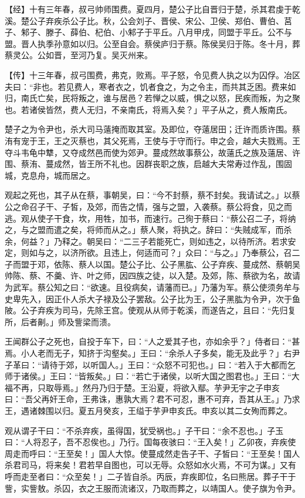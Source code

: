 \documentclass[]{article}
\begin{document}
【经】十有三年春，叔弓帅师围费。夏四月，楚公子比自晋归于楚，杀其君虔于乾溪。楚公子弃疾杀公子比。秋，公会刘子、晋侯、宋公、卫侯、郑伯、曹伯、莒子、邾子、滕子、薛伯、杞伯、小邾子于平丘。八月甲戌，同盟于平丘。公不与盟。晋人执季孙意如以归。公至自会。蔡侯庐归于蔡。陈侯吴归于陈。冬十月，葬蔡灵公。公如晋，至河乃复。吴灭州来。

【传】十三年春，叔弓围费，弗克，败焉。平子怒，令见费人执之以为囚俘。冶区夫曰：``非也。若见费人，寒者衣之，饥者食之，为之令主，而共其乏困。费来如归，南氏亡矣，民将叛之，谁与居邑？若惮之以威，惧之以怒，民疾而叛，为之聚也。若诸侯皆然，费人无归，不亲南氏，将焉入矣？」平子从之，费人叛南氏。

楚子之为令尹也，杀大司马薳掩而取其室。及即位，夺薳居田；迁许而质许围。蔡洧有宠于王，王之灭蔡也，其父死焉，王使与于守而行。申之会，越大夫戮焉。王夺斗韦龟中犨，又夺成然邑而使为郊尹。蔓成然故事蔡公，故薳氏之族及薳居、许围、蔡洧、蔓成然，皆王所不礼也。因群丧职之族，启越大夫常寿过作乱，围固城，克息舟，城而居之。

观起之死也，其子从在蔡，事朝吴，曰：``今不封蔡，蔡不封矣。我请试之。」以蔡公之命召子干、子皙，及郊，而告之情，强与之盟，入袭蔡。蔡公将食，见之而逃。观从使子干食，坎，用牲，加书，而速行。己徇于蔡曰：``蔡公召二子，将纳之，与之盟而遣之矣，将师而从之。」蔡人聚，将执之。辞曰：``失贼成军，而杀余，何益？」乃释之。朝吴曰：``二三子若能死亡，则如违之，以待所济。若求安定，则如与之，以济所欲。且违上，何适而可？」众曰：``与之。」乃奉蔡公，召二子而盟于邓，依陈、蔡人以国。楚公子比、公子黑肱、公子弃疾、蔓成然、蔡朝吴帅陈、蔡、不羹、许、叶之师，因四族之徒，以入楚。及郊，陈、蔡欲为名，故请为武军。蔡公知之曰：``欲速。且役病矣，请藩而已。」乃藩为军。蔡公使须务牟与史卑先入，因正仆人杀大子禄及公子罢敌。公子比为王，公子黑肱为令尹，次于鱼陂。公子弃疾为司马，先除王宫。使观从从师于乾溪，而遂告之，且曰：``先归复所，后者劓。」师及訾梁而溃。

王闻群公子之死也，自投于车下，曰：``人之爱其子也，亦如余乎？」侍者曰：``甚焉。小人老而无子，知挤于沟壑矣。」王曰：``余杀人子多矣，能无及此乎？」右尹子革曰：``请待于郊，以听国人。」王曰：``众怒不可犯也。」曰：``若入于大都而乞师于诸侯。」王曰：``皆叛矣。」曰：``若亡于诸侯，以听大国之图君也。」王曰：``大福不再，只取辱焉。」然丹乃归于楚。王沿夏，将欲入鄢。芋尹无宇之子申亥曰：``吾父再奸王命，王弗诛，惠孰大焉？君不可忍，惠不可弃，吾其从王。」乃求王，遇诸棘围以归。夏五月癸亥，王缢于芋尹申亥氏。申亥以其二女殉而葬之。

观从谓子干曰：``不杀弃疾，虽得国，犹受祸也。」子干曰：``余不忍也。」子玉曰：``人将忍子，吾不忍俟也。」乃行。国每夜骇曰：``王入矣！」乙卯夜，弃疾使周走而呼曰：``王至矣！」国人大惊。使蔓成然走告子干、子皙曰：``王至矣！国人杀君司马，将来矣！君若早自图也，可以无辱。众怒如水火焉，不可为谋。」又有呼而走至者曰：``众至矣！」二子皆自杀。丙辰，弃疾即位，名曰熊居。葬子干于訾，实訾敖。杀囚，衣之王服而流诸汉，乃取而葬之，以靖国人。使子旗为令尹。
\end{document}

